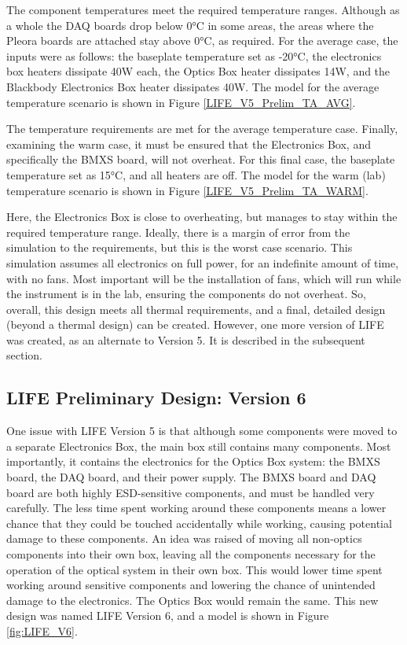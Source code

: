 The component temperatures meet the required temperature ranges. Although as a whole the DAQ boards drop below 0°C in some areas, the areas where the Pleora boards are attached stay above 0°C, as required. For the average case, the inputs were as follows: the baseplate temperature set as -20°C, the electronics box heaters dissipate 40W each, the Optics Box heater dissipates 14W, and the Blackbody Electronics Box heater dissipates 40W. The model for the average temperature scenario is shown in Figure \ref{LIFE_V5_Prelim_TA_AVG}.

The temperature requirements are met for the average temperature case. Finally, examining the warm case, it must be ensured that the Electronics Box, and specifically the BMXS board, will not overheat. For this final case, the baseplate temperature set as 15°C, and all heaters are off. The model for the warm (lab) temperature scenario is shown in Figure \ref{LIFE_V5_Prelim_TA_WARM}.

Here, the Electronics Box is close to overheating, but manages to stay within the required temperature range. Ideally, there is a margin of error from the simulation to the requirements, but this is the worst case scenario. This simulation assumes all electronics on full power, for an indefinite amount of time, with no fans. Most important will be the installation of fans, which will run while the instrument is in the lab, ensuring the components do not overheat. So, overall, this design meets all thermal requirements, and a final, detailed design (beyond a thermal design) can be created. However, one more version of LIFE was created, as an alternate to Version 5. It is described in the subsequent section.

\subsection{LIFE Preliminary Design: Version 6}
One issue with LIFE Version 5 is that although some components were moved to a separate Electronics Box, the main box still contains many components. Most importantly, it contains the electronics for the Optics Box system: the BMXS board, the DAQ board, and their power supply. The BMXS board and DAQ board are both highly ESD-sensitive components, and must be handled very carefully. The less time spent working around these components means a lower chance that they could be touched accidentally while working, causing potential damage to these components. An idea was raised of moving all non-optics components into their own box, leaving all the components necessary for the operation of the optical system in their own box. This would lower time spent working around sensitive components and lowering the chance of unintended damage to the electronics. The Optics Box would remain the same. This new design was named LIFE Version 6, and a model is shown in Figure \ref{fig:LIFE_V6}.

